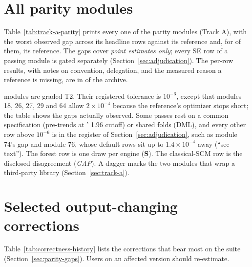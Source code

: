 \appendix

\section{All parity modules}\label{app:parity}

Table~\ref{tab:track-a-parity} prints every one of the
\RParityModuleCount{} parity modules (Track A), with the worst observed gap
across its headline rows against its  reference and, for
\StataParityModuleCount{} of them, its  reference. The gaps
cover \emph{point estimates only}; every SE row of a passing module is gated
separately (Section~\ref{sec:adjudication}). The per-row results, with notes
on convention, delegation, and the measured reason a  reference
is missing, are in  of the
archive.



\noindent \RParityStrictCount{} modules are graded T2. Their registered
tolerance is \(10^{-6}\), except that modules 18, 26, 27, 29 and 64 allow
\(2\times10^{-4}\) because the reference's optimizer stops short; the table
shows the gaps actually observed. Some passes rest on a common specification
(pre-trends at ' 1.96 cutoff) or shared folds (DML), and every
other row above \(10^{-6}\) is in the register of
Section~\ref{sec:adjudication}, such as module 74's  gap and module 76, whose default
 rows sit up to \(1.4\times10^{-4}\) away (``see text''). The
forest row is one draw per engine (\textbf{S}). The classical-SCM row is the
disclosed disagreement (\textit{GAP}). A dagger marks the two modules that wrap a third-party 
library (Section~\ref{sec:track-a}).

\section{Selected output-changing corrections}\label{app:corrections}

Table~\ref{tab:correctness-history} lists the corrections that bear most on the
suite (Section~\ref{sec:parity-gaps}). Users on an affected version should
re-estimate.

